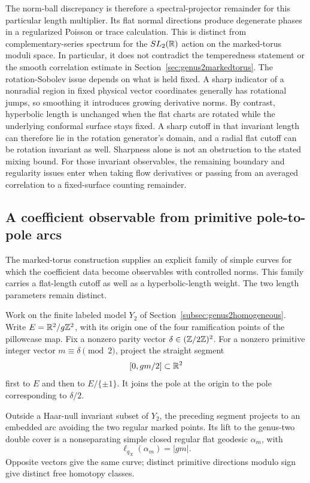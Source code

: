 The norm-ball discrepancy is therefore a spectral-projector remainder
for this particular length multiplier. Its flat normal directions
produce degenerate phases in a regularized Poisson or trace calculation.
This is distinct from complementary-series spectrum for the
$SL_2(\mathbb R)$ action on the marked-torus moduli space. In particular, it
does not contradict the temperedness statement or the smooth
correlation estimate in Section~\ref{sec:genus2markedtorus}. The
rotation-Sobolev issue depends on what is held fixed. A sharp indicator
of a nonradial region in fixed physical vector coordinates generally
has rotational jumps, so smoothing it introduces growing derivative
norms. By contrast, hyperbolic length is unchanged when the flat charts
are rotated while the underlying conformal surface stays fixed. A sharp
cutoff in that invariant length can therefore lie in the rotation
generator's domain, and a radial flat cutoff can be rotation invariant
as well. Sharpness alone is not an obstruction to the stated mixing
bound. For those invariant observables, the remaining boundary and
regularity issues enter when taking flow derivatives or passing from
an averaged correlation to a fixed-surface counting remainder.

\subsection{A coefficient observable from primitive pole-to-pole arcs}
\label{subsec:primitivepolebridge}

The marked-torus construction supplies an explicit family of simple curves
for which the coefficient data become observables with controlled norms.
This family carries a flat-length cutoff as well as a hyperbolic-length
weight. The two length parameters remain distinct.

Work on the finite labeled model $Y_2$ of
Section~\ref{subsec:genus2homogeneous}. Write
$E=\mathbb R^2/g\mathbb Z^2$, with its origin one of the four ramification points
of the pillowcase map. Fix a nonzero parity vector
$\delta\in(\mathbb Z/2\mathbb Z)^2$. For a nonzero primitive integer vector
$m\equiv\delta\pmod2$, project the straight segment
\[
 [0,gm/2]\subset\mathbb R^2
\]
first to $E$ and then to $E/\{\pm1\}$. It joins the pole at the
origin to the pole corresponding to $\delta/2$.

\begin{lemma}
\label{lem:primitivepolearcs}
Outside a Haar-null invariant subset of $Y_2$, the preceding segment
projects to an embedded arc avoiding the two regular marked points.
Its lift to the genus-two double cover is a nonseparating simple
closed regular flat geodesic $\alpha_m$, with
\begin{equation}
 \ell_{q_X}(\alpha_m)=|gm|.
 \label{eq:polearcflatlength}
\end{equation}
Opposite vectors give the same curve; distinct primitive directions
modulo sign give distinct free homotopy classes.
\end{lemma}


